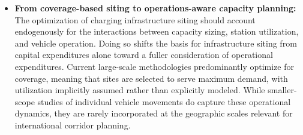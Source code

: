 \begin{itemize}
    \item[(i)] \textbf{From coverage-based siting to operations-aware capacity planning:} 
    The optimization of charging infrastructure siting should account endogenously for the interactions between capacity sizing, station utilization, and vehicle operation. Doing so shifts the basis for infrastructure siting from capital expenditures alone toward a fuller consideration of operational expenditures. Current large-scale methodologies predominantly optimize for coverage, meaning that sites are selected to serve maximum demand, with utilization implicitly assumed rather than explicitly modeled. While smaller-scope studies of individual vehicle movements do capture these operational dynamics, they are rarely incorporated at the geographic scales relevant for international corridor planning.
    

\end{itemize}
